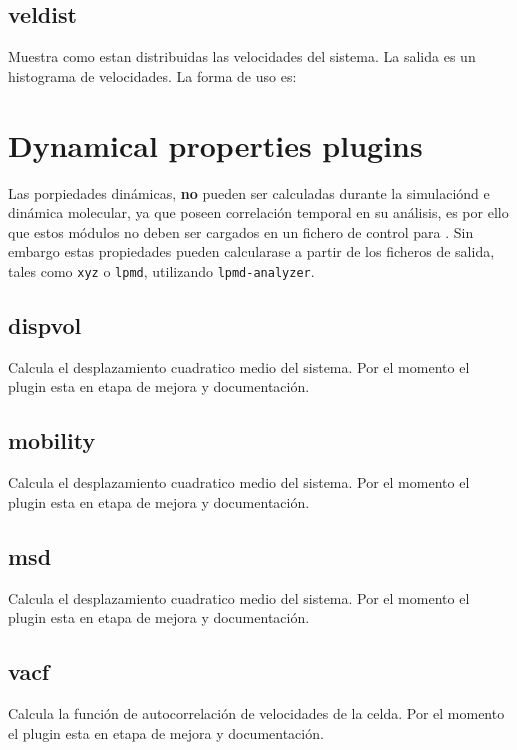 \subsection{veldist}
Muestra como estan distribuidas las velocidades del sistema. La salida es un
histograma de velocidades. La forma de uso es:


\section{Dynamical properties plugins}
Las porpiedades din\'amicas, \textbf{no} pueden ser calculadas durante la
simulaci\'ond e din\'amica molecular, ya que poseen correlaci\'on temporal en su
an\'alisis, es por ello que estos m\'odulos no deben ser cargados en un fichero
de control para {\lpmd}. Sin embargo estas propiedades pueden calcularase a
partir de los ficheros de salida, tales como \verb|xyz| o \verb|lpmd|,
utilizando \verb|lpmd-analyzer|.
\subsection{dispvol}
Calcula el desplazamiento cuadratico medio del sistema. Por el momento el plugin
esta en etapa de mejora y documentaci\'on.
\subsection{mobility}
Calcula el desplazamiento cuadratico medio del sistema. Por el momento el plugin
esta en etapa de mejora y documentaci\'on.
\subsection{msd}
Calcula el desplazamiento cuadratico medio del sistema. Por el momento el plugin
esta en etapa de mejora y documentaci\'on.
\subsection{vacf}
Calcula la funci\'on de autocorrelaci\'on de velocidades de la celda. Por el
momento el plugin esta en etapa de mejora y documentaci\'on.


